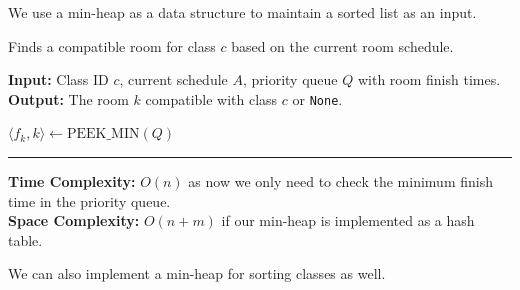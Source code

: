 \noindent 
We use a min-heap as a data structure to maintain a sorted list as an input.

\begin{Func}
    Finds a compatible room for class $c$ based on the current room schedule.

    \vspace{.5em}
    \noindent
    \textbf{Input:} Class ID $c$, current schedule $A$, priority queue $Q$ with room finish times.\\
    \textbf{Output:} The room $k$ compatible with class $c$ or \texttt{None}.\\
    \begin{algorithm}[H]
        \SetAlgoLined
        $\langle f_k, k \rangle \gets \text{PEEK\_MIN}(Q)$ 

    \end{algorithm}

    \vspace{1em}
    \noindent\rule{\textwidth}{0.4pt}

    \noindent
    \textbf{Time Complexity:} $O(n)$ as now we only need to check the minimum finish time in the priority queue.\\
    \textbf{Space Complexity:} $O(n+m)$ if our min-heap is implemented as a hash table.
\end{Func}
\noindent
We can also implement a min-heap for sorting classes as well. 
\newpage
